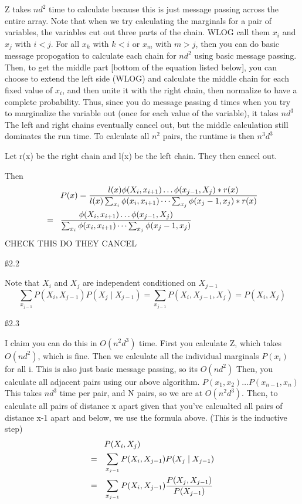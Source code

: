 Z takes $nd^2$ time to calculate because this is just message passing across the entire array. Note that when we try calculating the marginals for a pair of variables, the variables cut out three parts of the chain. WLOG call them $x_i$ and $x_j$ with $i<j$. For all $x_k$ with $k<i$ or $x_m$ with $m>j$, then you can do basic message propogation to calculate each chain for $nd^2$ using basic message passing. Then, to get the middle part [bottom of the equation listed below], you can choose to extend the left side (WLOG) and calculate the middle chain for each fixed value of $x_i$, and then unite it with the right chain, then normalize to have a complete probability. Thus, since you do message passing d times when you try to marginalize the variable out (once for each value of the variable), it takes $nd^3$ The left and right chains eventually cancel out, but the middle calculation still dominates the run time. To calculate all $n^2$ pairs, the runtime is then $n^3d^3$

Let r(x) be the right chain and l(x) be the left chain. They then cancel out.

Then \begin{align*}
& P(x) = \frac{l(x) \phi(X_i,x_{i+1}) \dots\phi(x_{j-1},X_j)*r(x)}{l(x) \sum_{x_i}\phi(x_i,x_{i+1}) \dots \sum_{x_j}\phi(x_j-1,x_{j})*r(x)} \\ = \hspace{3 mm} &
\frac{\phi(X_i,x_{i+1}) \dots\phi(x_{j-1},X_j)}{ \sum_{x_i}\phi(x_i,x_{i+1}) \dots \sum_{x_j}\phi(x_j-1,x_{j})}
\end{align*}
CHECK THIS DO THEY CANCEL

\ss{2.2}

Note that $X_i$ and $X_j$ are independent conditioned on $X_{j-1}$
\[\sum_{x_{j-1}} P(X_i,X_{j-1})P(X_j \mid X_{j-1}) = \sum_{x_{j-1}} P(X_i,X_{j-1},X_j) = P(X_i,X_j) 
\]

\ss{2.3}

I claim you can do this in $O(n^2d^3)$ time. First you calculate Z, which takes $O(nd^2)$, which is fine. Then we calculate all the individual marginals $P(x_i)$ for all i. This is also just basic message passing, so its $O(nd^2)$  Then, you calculate all adjacent pairs using our above algorithm. $P(x_1,x_2) \dots P(x_{n-1},x_n)$ This takes $nd^3$ time per pair, and N pairs, so we are at $O(n^2d^3)$.
Then, to calculate all pairs of distance x apart given that you've calcualted all pairs of distance x-1 apart and below, we use the formula above. (This is the inductive step)
\begin{align*}
& P(X_i,X_j) \\ = \hspace{3 mm} & \sum_{x_{j-1}} P(X_i,X_{j-1})P(X_j \mid X_{j-1}) \\ = \hspace{3 mm} &
\sum_{x_{j-1}} P(X_i,X_{j-1}) \frac{P(X_j, X_{j-1})}{P(X_{j-1})}
\end{align*}

